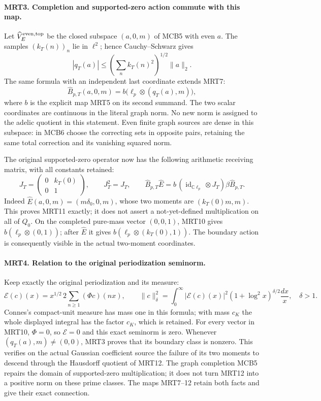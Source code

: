 \paragraph{MRT3. Completion and supported-zero action commute with this map.}
Let \(\widehat V_E^{\rm even,top}\) be the closed subspace
\((a,0,m)\) of MCB5 with even \(a\). The samples
\((k_T(n))_n\) lie in \(\ell^2\); hence Cauchy--Schwarz gives
\[
 |q_T(a)|\le
 \left(\sum_n k_T(n)^2\right)^{1/2}\|a\|_2.              \tag{MRT9}
\]
The same formula with an independent last coordinate extends MRT7:
\[
 \widehat B_{p,T}(a,0,m)=
 b\bigl(\ell_p\otimes(q_T(a),m)\bigr),                   \tag{MRT10}
\]
where \(b\) is the explicit map MRT5 on its second summand.
The two scalar coordinates are continuous in the literal graph
norm. No new norm is assigned to the adelic quotient in this
statement. Even finite graph sources are dense in this subspace:
in MCB6 choose the correcting sets in opposite pairs, retaining
the same total correction and its vanishing squared norm.

The original supported-zero operator now has the following
arithmetic receiving matrix, with all constants retained:
\[
 J_T=\begin{pmatrix}0&k_T(0)\\0&1\end{pmatrix},\qquad
 J_T^2=J_T,\qquad
 \widehat B_{p,T}\widehat E
   =b\,(\operatorname{id}_{\mathbb C\ell_p}\otimes J_T)
                         \beta\widehat B_{p,T}.            \tag{MRT11}
\]
Indeed \(\widehat E(a,0,m)=(m\delta_0,0,m)\), whose two
moments are \((k_T(0)m,m)\). This proves MRT11 exactly;
it does not assert a not-yet-defined multiplication on all of
\(Q_0\). On the completed pure-mass vector \((0,0,1)\),
MRT10 gives \(b(\ell_p\otimes(0,1))\); after \(\widehat E\)
it gives \(b(\ell_p\otimes(k_T(0),1))\). The boundary action
is consequently visible in the actual two-moment coordinates.

\paragraph{MRT4. Relation to the original periodization seminorm.}
Keep exactly the original periodization and its measure:
\[
 \mathcal E(c)(x)=x^{1/2}\,2\sum_{n\ge1}(\Phi c)(nx),\qquad
 \|c\|_\delta^2=\int_0^\infty|\mathcal E(c)(x)|^2
                 (1+\log^2x)^{\delta/2}\frac{dx}{x},
 \quad\delta>1.                                          \tag{MRT12}
\]
Connes's compact-unit measure has mass one in this formula; with
mass \(c_K\) the whole displayed integral has the factor \(c_K\),
which is retained. For every vector in MRT10, \(\Phi=0\),
so \(\mathcal E=0\) and this exact seminorm is zero. Whenever
\((q_T(a),m)\ne(0,0)\), MRT3 proves that its boundary class is
nonzero. This verifies on the actual Gaussian coefficient source
the failure of its two moments to descend through the Hausdorff
quotient of MRT12. The graph completion MCB5 repairs the domain
of supported-zero multiplication; it does not turn MRT12 into
a positive norm on these prime classes. The maps MRT7--12 retain
both facts and give their exact connection.

